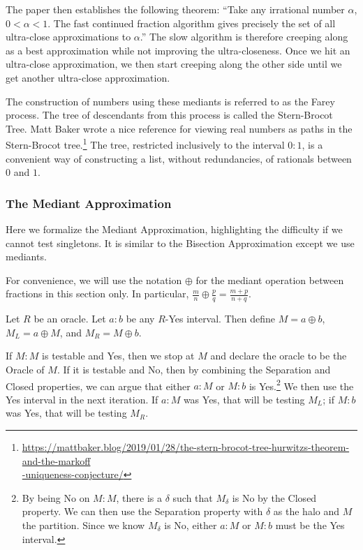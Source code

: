 \documentclass[12pt]{article}
\begin{document}
The paper then establishes the following theorem: ``Take any irrational number $\alpha$, $0 < \alpha < 1$. The fast continued fraction algorithm gives precisely the set of all ultra-close approximations to $\alpha$.''  The slow algorithm is therefore creeping along as a best approximation while not improving the ultra-closeness. Once we hit an ultra-close approximation, we then start creeping along the other side until we get another ultra-close approximation. 

The construction of numbers using these mediants is referred to as the Farey process. The tree of descendants from this process is called the Stern-Brocot Tree. Matt Baker wrote a nice reference for viewing real numbers as paths in the Stern-Brocot tree.\footnote{{\href{https://mattbaker.blog/2019/01/28/the-stern-brocot-tree-hurwitzs-theorem-and-the-markoff-uniqueness-conjecture/}{https://mattbaker.blog/2019/01/28/the-stern-brocot-tree-hurwitzs-theorem-and-the-markoff} \\ \hspace*{10px}  \href{https://mattbaker.blog/2019/01/28/the-stern-brocot-tree-hurwitzs-theorem-and-the-markoff-uniqueness-conjecture/}{-uniqueness-conjecture/} }} The tree, restricted inclusively to the interval $0:1$, is a convenient way of constructing a list, without redundancies, of rationals between $0$ and $1$. 

\subsubsection{The Mediant Approximation}

Here we formalize the Mediant Approximation, highlighting the difficulty if we cannot test singletons.  It is similar to the Bisection Approximation except we use mediants. 

For convenience, we will use the notation $\oplus$ for the mediant operation between fractions in this section only. In particular, $\frac{m}{n} \oplus \frac{p}{q} = \frac{m+p}{n+q}$. 

Let $R$ be an oracle. Let $a:b$ be any $R$-Yes interval. Then define $M = a\oplus b$, $M_L = a \oplus M$, and $M_R = M \oplus b$. 

If $M:M$ is testable and Yes, then we stop at $M$ and declare the oracle to be the Oracle of $M$. If it is testable and No, then by combining the Separation and Closed properties, we can argue that either $a:M$ or $M:b$ is Yes.\footnote{By being No on $M:M$, there is a $\delta$ such that $M_\delta$ is No by the Closed property. We can then use the Separation property with $\delta$ as the halo and $M$ the partition. Since we know $M_\delta$ is No, either $a:M$ or $M:b$ must be the Yes interval.} We then use the Yes interval in the next iteration. If $a:M$ was Yes, that will be testing $M_L$; if $M:b$ was Yes, that will be testing $M_R$.
\end{document}
